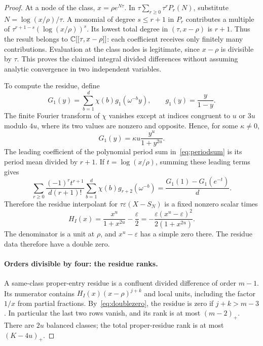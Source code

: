 \documentclass[11pt,letterpaper]{article}
\numberwithin{equation}{section}
\theoremstyle{remark}\newtheorem{remark}[theorem]{Remark}
\begin{document}
\begin{proof}
At a node of the class, $x=\rho e^{N\tau}$. In $\tau\sum_{r\ge0}\tau^rP_r(N)$, substitute $N=\log(x/\rho)/\tau$. A monomial of degree $s\le r+1$ in $P_r$ contributes a multiple of
$\tau^{r+1-s}(\log(x/\rho))^s$. Its lowest total degree in $(\tau,x-\rho)$ is $r+1$. Thus the result belongs to $\mathbb C[[\tau,x-\rho]]$: each coefficient receives only finitely many contributions. Evaluation at the class nodes is legitimate, since $x-\rho$ is divisible by $\tau$. This proves the claimed integral divided differences without assuming analytic convergence in two independent variables.

To compute the residue, define
\begin{equation*}
 G_1(y)=\sum_{b=1}^d\chi(b)g_1(\omega^{-b}y),\qquad g_1(y)=\frac{y}{1-y}.
\end{equation*}
The finite Fourier transform of $\chi$ vanishes except at indices congruent to $u$ or $3u$ modulo $4u$, where its two values are nonzero and opposite. Hence, for some $\kappa\ne0$,
\begin{equation}\label{eq:G1}
 G_1(y)=\kappa u\frac{y^u}{1+y^{2u}}.
\end{equation}
The leading coefficient of the polynomial period sum in~\eqref{eq:periodsum} is its period mean divided by $r+1$. If $t=\log(x/\rho)$, summing these leading terms gives
\begin{equation*}
 \sum_{r\ge0}\frac{(-1)^rt^{r+1}}{d(r+1)!}
       \sum_{b=1}^d\chi(b)g_{r+2}(\omega^{-b})
 =\frac{G_1(1)-G_1(e^{-t})}{d}.
\end{equation*}
Therefore the residue interpolant for $\tau\varepsilon(X-S_N)$ is a fixed nonzero scalar times
\begin{equation}\label{eq:doublezero}
 H_I(x)=\frac{x^u}{1+x^{2u}}-\frac{\varepsilon}{2}
 =-\frac{\varepsilon(x^u-\varepsilon)^2}{2(1+x^{2u})}.
\end{equation}
The denominator is a unit at $\rho$, and $x^u-\varepsilon$ has a simple zero there. The residue data therefore have a double zero.

\paragraph{Orders divisible by four: the residue ranks.}
A same-class proper-entry residue is a confluent divided difference of order $m-1$. Its numerator contains $H_I(x)(x-\rho)^{j+k}$ and local units, including the factor $1/x$ from partial fractions. By~\eqref{eq:doublezero}, the residue is zero if $j+k>m-3$. In particular the last two rows vanish, and its rank is at most $(m-2)_+$. There are $2u$ balanced classes; the total proper-residue rank is at most $(K-4u)_+$.


\end{proof}
\end{document}
